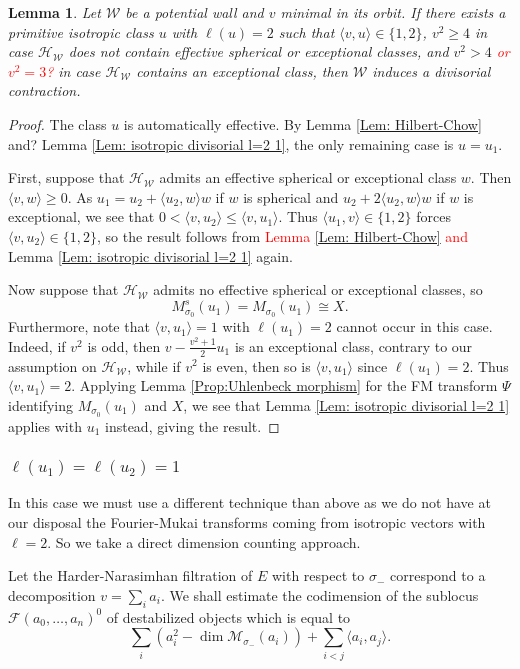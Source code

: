 \documentclass[leqno,11pt]{amsart}
\def\dim{\mathop{\mathrm{dim}}\nolimits}
\newtheorem{Lem}[Thm]{Lemma}
\theoremstyle{definition}
\def\FF{\ensuremath{\mathcal F}}
\def\HH{\ensuremath{\mathcal H}}
\def\MM{\ensuremath{\mathcal M}}
\def\WW{\ensuremath{\mathcal W}}
\begin{document}
\begin{Lem}\label{Lem: isotropic divisorial l=2 3}
Let $\WW$ be a potential wall and $v$ minimal in its orbit.  If there exists a primitive isotropic class $u$ with $\ell(u)=2$ such that $\langle v,u\rangle\in\{1,2\}$, $v^2\geq 4$ in case $\HH_{\WW}$ does not contain effective spherical or exceptional classes, and $v^2 > 4$ \textcolor{red}{or $v^2=3$?} in case $\HH_{\WW}$ contains an exceptional class, then $\WW$ induces a divisorial contraction.
\end{Lem}
\begin{proof}
The class $u$ is automatically effective.  
By {\color{red} Lemma \ref{Lem: Hilbert-Chow} and?} Lemma \ref{Lem: isotropic divisorial l=2 1}, the only remaining case is $u=u_1$.  

First, suppose that $\HH_{\WW}$ admits an effective spherical or exceptional class $w$.  Then $\langle v,w\rangle\geq 0$.  As $u_1=u_2+\langle u_2,w\rangle w$ if $w$ is spherical and $u_2+2\langle u_2,w\rangle w$ if $w$ is exceptional, we see that $0<\langle v,u_2\rangle\leq\langle v,u_1\rangle$.  Thus $\langle u_1,v\rangle\in\{1,2\}$ forces $\langle v,u_2\rangle\in\{1,2\}$, so the result follows from \textcolor{red}{Lemma \ref{Lem: Hilbert-Chow} and } Lemma \ref{Lem: isotropic divisorial l=2 1} again.

Now suppose that $\HH_{\WW}$ admits no effective spherical or exceptional classes, so $$M_{\sigma_0}^s(u_1)=M_{\sigma_0}(u_1)\cong X.$$  Furthermore, note that $\langle v,u_1\rangle=1$ with $\ell(u_1)=2$ cannot occur in this case.  Indeed, if $v^2$ is odd, then $v-\frac{v^2+1}{2}u_1$ is an exceptional class, contrary to our assumption on $\HH_\WW$, while if $v^2$ is even, then so is $\langle v,u_1\rangle$ since $\ell(u_1)=2$.  Thus $\langle v,u_1\rangle=2$.  Applying Lemma \ref{Prop:Uhlenbeck morphism} for the FM transform $\Psi$ identifying $M_{\sigma_0}(u_1)$ and $X$, 
we see that 
Lemma \ref{Lem: isotropic divisorial l=2 1} applies with $u_1$ instead, giving the result.
\end{proof}

\subsubsection{$\ell(u_1)=\ell(u_2)=1$} In this case we must use a different technique than above as we do not have at our disposal the Fourier-Mukai transforms coming from isotropic vectors with $\ell=2$.  So we take a direct dimension counting approach.  

Let the Harder-Narasimhan filtration of $E$ with respect to $\sigma_-$ correspond to a decomposition $v=\sum_i a_i$.  We shall estimate the codimension of the sublocus $\FF(a_0,\ldots,a_n)^0$ of destabilized objects which is equal to
 \begin{equation}
\sum_i (a_i^2-\dim \MM_{\sigma_-}(a_i))+\sum_{i<j}\langle a_i,a_j \rangle.
\end{equation}
\end{document}
